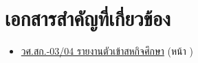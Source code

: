 \chapter{เอกสารสำคัญที่เกี่ยวข้อง}
\begin{itemize}
    \item \hyperlink{target:03-04}{วศ.สก.-03/04 รายงานตัวเข้าสหกิจศึกษา} (หน้า \pageref{page:03-04})
\end{itemize}


